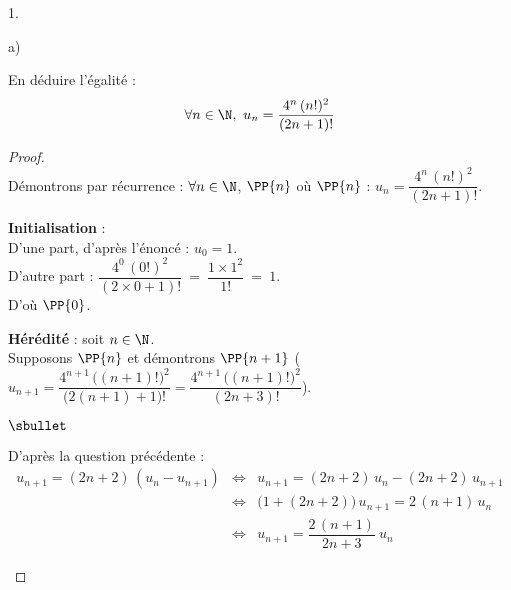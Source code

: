 \documentclass[11pt]{article}%
\begin{document}
\begin{noliste}{1.}
\begin{noliste}{a)}
  \item En déduire l'égalité :
    \[
      \forall n \in \N, \ u_n = \dfrac{4^n \, (n!)^2}{(2n+1)!}
    \]
    \begin{proof}~\\
      Démontrons par récurrence : $\forall n \in \N$, $\PP{n}$ \quad
      où \quad $\PP{n}$ : $ u_n = \dfrac{4^n \, (n!)^2}{(2n+1)!}$.
      \begin{noliste}{\fitem}
      \item {\bf Initialisation} :\\
        D'une part, d'après l'énoncé : $u_0 = 1$.\\[.2cm]
        D'autre part : $\dfrac{4^0 \, (0!)^2}{(2 \times 0+1)!} \ = \
        \dfrac{1 \times 1^2}{1!} \ = \ 1$.\\
        D'où $\PP{0}$.


        \newpage
        
        
      \item {\bf Hérédité} : soit $n \in \N$.\\
        Supposons $\PP{n}$ et démontrons $\PP{n+1}$ (\ie $u_{n+1} =
        \dfrac{4^{n+1} \, \big((n+1)!\big)^2}{\big(2(n+1)+1\big)!} =
        \dfrac{4^{n+1} \, \big((n+1)!\big)^2}{(2n+3)!}$).
        \begin{noliste}{$\sbullet$}
        \item D'après la question précédente :
          \[
            \begin{array}{rcl}
              u_{n+1} = (2n+2) \, (u_n - u_{n+1})
              & \Leftrightarrow & u_{n+1} = (2n+2) \, u_n - (2n +2) \,
                                  u_{n+1}
              \\[.4cm]
              & \Leftrightarrow & \big( 1+ (2n+2)\big) \, u_{n+1} = 2 \,
                                  (n+1) \, u_n
              \\[.4cm]
              & \Leftrightarrow & u_{n+1} = \dfrac{2 \, (n+1)}{2n+3} \ u_n
            \end{array}
          \]
          

\end{noliste}
\end{noliste}
\end{proof}
\end{noliste}
\end{noliste}
\end{document}
